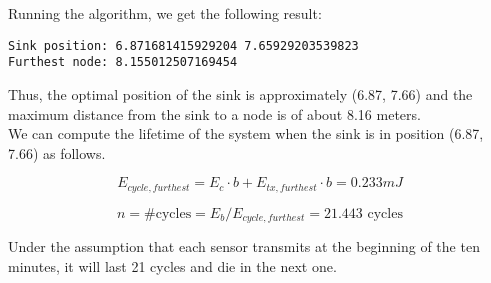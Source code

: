 Running the algorithm, we get the following result:
\begin{verbatim}
Sink position: 6.871681415929204 7.65929203539823
Furthest node: 8.155012507169454
\end{verbatim}

Thus, the optimal position of the sink is approximately (6.87, 7.66) and the maximum distance from the sink to a node is of about 8.16 meters.\\
We can compute the lifetime of the system when the sink is in position (6.87, 7.66) as follows.

\[
E_{cycle, furthest} = E_c \cdot b + E_{tx, furthest} \cdot b = 0.233 mJ
\]

\[
n = \text{\# cycles} = E_b / E_{cycle, furthest} = 21.443 \text{ cycles}
\]

Under the assumption that each sensor transmits at the beginning of the ten minutes, it will last 21 cycles and die in the next one.




